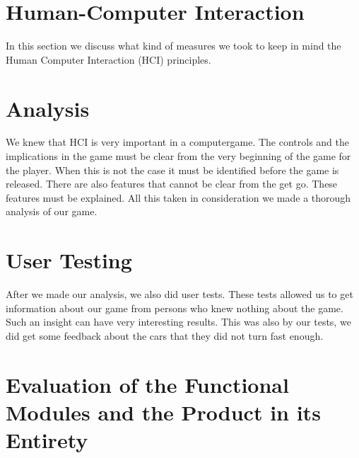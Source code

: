 \documentclass[11pt,twoside,a4paper]{article}
\begin{document}
\newpage

\section{Human-Computer Interaction}
In this section we discuss what kind of measures we took to keep in mind the Human Computer Interaction (HCI) principles.

\section{Analysis}
We knew that HCI is very important in a computergame. The controls and the implications in the game must be clear from the very beginning of the game for the player. When this is not the case it must be identified before the game is released. There are also features that cannot be clear from the get go. These features must be explained. All this taken in consideration we made a thorough analysis of our game.

\section{User Testing}
After we made our analysis, we also did user tests. These tests allowed us to get information about our game from persons who knew nothing about the game. Such an insight can have very interesting results. This was also by our tests, we did get some feedback about the cars that they did not turn fast enough.

\newpage

\section*{Evaluation of the Functional Modules and the Product in its Entirety}
\end{document}
